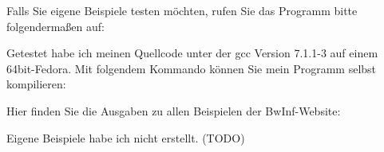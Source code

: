 Falls Sie eigene Beispiele testen möchten, rufen Sie das Programm bitte folgendermaßen auf:


Getestet habe ich meinen Quellcode unter der gcc Version 7.1.1-3 auf einem 64bit-Fedora.
Mit folgendem Kommando können Sie mein Programm selbst kompilieren:


Hier finden Sie die Ausgaben zu allen Beispielen der BwInf-Website:








Eigene Beispiele habe ich nicht erstellt. (TODO)

